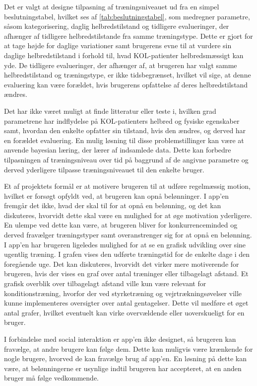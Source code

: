 Det er valgt at designe tilpasning af træningsniveauet ud fra en simpel beslutningstabel, hvilket ses af \autoref{tab:beslutningstabel}, som medregner parametre, såsom kategorisering, daglig helbredstilstand og tidligere evalueringer, der afhænger af tidligere helbredstilstande fra samme træningstype. Dette er gjort for at tage højde for daglige variationer samt brugerens evne til at vurdere sin daglige helbredstilstand i forhold til, hvad KOL-patienter helbredsmæssigt kan yde. De tidligere evalueringer, der afhænger af, at brugeren har valgt samme helbredstilstand og træningstype, er ikke tidsbegrænset, hvilket vil sige, at denne evaluering kan være forældet, hvis brugerens opfattelse af deres helbredstilstand ændres.

Det har ikke været muligt at finde litteratur eller teste i, hvilken grad parametrene har indflydelse på KOL-patienters helbred og fysiske egenskaber samt, hvordan den enkelte opfatter sin tilstand, hvis den ændres, og derved har en forældet evaluering. En mulig løsning til disse problemstillinger kan være at anvende bayesian læring, der lærer af indsamlede data. Dette kan forbedre tilpasningen af træningsniveau over tid på baggrund af de angivne parametre og derved yderligere tilpasse træningsniveauet til den enkelte bruger. 

Et af projektets formål er at motivere brugeren til at udføre regelmæssig motion, hvilket er forsøgt opfyldt ved, at brugeren kan opnå belønninger. I app’en fremgår det ikke, hvad der skal til for at opnå en belønning, og det kan diskuteres, hvorvidt dette skal være en mulighed for at øge motivation yderligere. En ulempe ved dette kan være, at brugeren bliver for konkurrenceminded og derved fravælger træningstyper samt overanstrenger sig for at opnå en belønning. I app'en har brugeren ligeledes mulighed for at se en grafisk udvikling over sine ugentlig træning. I grafen vises den udførte træningstid for de enkelte dage i den foregående uge. Det kan diskuteres, hvorvidt det virker mere motiverende for brugeren, hvis der vises en graf over antal træninger eller tilbagelagt afstand. Et grafisk overblik over tilbagelagt afstand ville kun være relevant for konditionstræning, hvorfor der ved styrketræning og vejrtrækningsøvelser ville kunne implementeres oversigter over antal gentagelser. Dette vil medføre et øget antal grafer, hvilket eventuelt kan virke overvældende eller uoverskueligt for en bruger.

I forbindelse med social interaktion er app’en ikke designet, så brugeren kan fravælge, at andre brugere kan følge dem. Dette kan muligvis være krænkende  for nogle brugere, hvorved de kan fravælge brug af app’en. En løsning på dette kan være, at belønningerne er usynlige indtil brugeren har accepteret, at en anden bruger må følge vedkommende.

